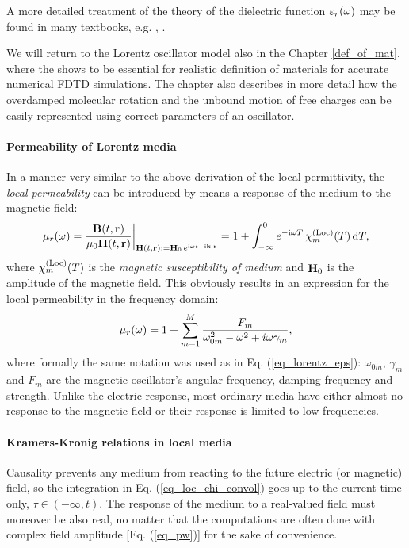 A more detailed treatment of the theory of the dielectric function $\varepsilon_r(\omega)$ may be found in many textbooks, e.g. \cite[p. 454]{klingshirn2007semiconductor}, \cite{dresselhaus1966optical}. 

We will return to the Lorentz oscillator model also in the Chapter \ref{def_of_mat}, where the shows to be essential for realistic definition of materials for accurate numerical FDTD simulations. The chapter also describes in more detail how the overdamped molecular rotation and the unbound motion of free charges can be easily represented using correct parameters of an oscillator.
\paragraph{Permeability of Lorentz media}  %
In a manner very similar to the above derivation of the local permittivity, the \textit{local permeability} can be introduced by means a response of the medium to the magnetic field:
\begin{equation} \mu_r(\omega) = \frac{\mathbf{B}(t,{\mathbf{r}})}{\mu_0\mathbf{H}(t,{\mathbf{r}})} \biggr|_{\mathbf{H}(t, {\mathbf{r}}) := \mathbf{H}_0 \, e^{{\mathrm i}\omega t - {\mathrm i}{\mathbf{k}}\cdot{\mathbf{r}}}} = 1 + \int_{-\infty}^{0} e^{-{\mathrm i}\omega T} \,\chi_m^{\rm(Loc)}(T) \,\mbox{d}T, \label{eq_mu_loc}\end{equation}
where $\chi_m^{\rm(Loc)}(T)$ is the \textit{magnetic susceptibility of medium} and $\mathbf{H}_0$ is the amplitude of the magnetic field. This obviously results in an expression for the local permeability in the frequency domain:
\begin{equation} \mu_r(\omega) = 1 + \sum_{m=1}^M \frac{F_m}{\omega_{0m}^2 - \omega^2 + i\omega\gamma_m}, \label{eq_lorentz_mu}\end{equation} %
where formally the same notation was used as in  Eq. (\ref{eq_lorentz_eps}): $\omega_{0m}$, $\gamma_m$ and $F_m$ are the magnetic oscillator's angular frequency, damping frequency and strength. Unlike the electric response, most ordinary media have either almost no response to the magnetic field %
or their response is limited to low frequencies.

\paragraph{Kramers-Kronig relations in local media}%
Causality prevents any medium from reacting to the future electric (or magnetic) field, so the integration in Eq. (\ref{eq_loc_chi_convol}) goes up to the current time only, $\tau \in (-\infty, t)$. The response of the medium to a real-valued field must moreover be also real, no matter that the computations are often done with complex field amplitude [Eq. (\ref{eq_pw})] for the sake of convenience. 

